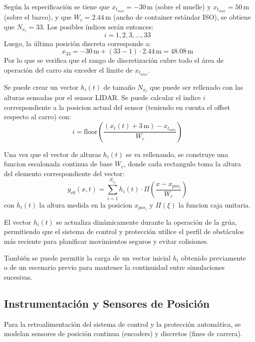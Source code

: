 \documentclass[11pt]{article}                                    %
\begin{document}
Según la especificación se tiene que $x_{t_{min}}=-30\,$m (sobre el muelle) y $x_{t_{max}}=50\,$m (sobre el barco), y que $W_c=2.44\,$m (ancho de container estándar ISO), se obtiene que $N_{x_t} = 33$. Los posibles índices serán entonces:
\begin{equation}
    i = 1, 2, 3, \ldots, 33
\end{equation}
Luego, la última posición discreta corresponde a:
\begin{equation}
    x_{33} = -30\,\text{m} + (33-1) \cdot 2.44\,\text{m} = 48.08\,\text{m}
\end{equation}
Por lo que se verifica que el rango de discretización cubre todo el área de operación del carro sin exceder el límite de $x_{t_{max}}$.

Se puede crear un vector $h_i(t)$ de tamaño $N_{x_t}$ que puede ser rellenado con las alturas sensadas por el sensor LIDAR. Se puede calcular el indice $i$ correspondiente a la posicion actual del sensor (teniendo en cuenta el offset respecto al carro) con:
\begin{equation}
    i = \text{floor}\left( \frac{(x_t(t)+3\,\text{m}) - x_{t_{min}}}{W_c} \right)
\end{equation}

Una vez que el vector de alturas $h_i(t)$ se va rellenando, se construye una funcion escalonada continua de base $W_c$, donde cada rectangulo toma la altura del elemento correspondiente del vector:
\begin{equation}
    y_{c0}(x,t) = \sum_{i=1}^{N_{x_t}} h_i(t)\cdot
    \Pi\!\left(\frac{x - x_{pos_i}}{W_c}\right)
\end{equation}
con $h_i(t)$ la altura medida en la posicion $x_{pos_i}$ y $\Pi(\xi)$ la funcion caja unitaria.

El vector $h_i(t)$ se actualiza dinámicamente durante la operación de la grúa, permitiendo que el sistema de control y protección utilice el perfil de obstáculos más reciente para planificar movimientos seguros y evitar colisiones.

También se puede permitir la carga de un vector inicial $h_i$ obtenido previamente o de un escenario previo para mantener la continuidad entre simulaciones sucesivas.

\subsection{Instrumentación y Sensores de Posición}
Para la retroalimentación del sistema de control y la protección automática, se modelan sensores de posición continua (encoders) y discretos (fines de carrera).
\end{document}
